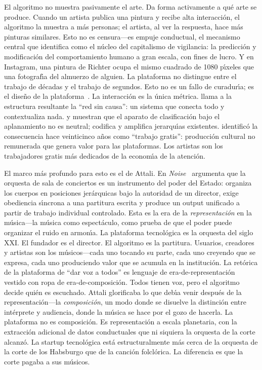 \documentclass[10pt,letterpaper,twocolumn]{article}
\begin{document}
El algoritmo no muestra pasivamente el arte. Da forma activamente a qu\'{e} arte se produce. Cuando un artista publica una pintura y recibe alta interacci\'{o}n, el algoritmo la muestra a m\'{a}s personas; el artista, al ver la respuesta, hace m\'{a}s pinturas similares. Esto no es censura---es empuje conductual, el mecanismo central que \citet{zuboff2019surveillance} identifica como el n\'{u}cleo del capitalismo de vigilancia: la predicci\'{o}n y modificaci\'{o}n del comportamiento humano a gran escala, con fines de lucro. Y en Instagram, una pintura de Richter ocupa el mismo cuadrado de 1080 p\'{\i}xeles que una fotograf\'{\i}a del almuerzo de alguien. La plataforma no distingue entre el trabajo de d\'{e}cadas y el trabajo de segundos. Esto no es un fallo de curadur\'{\i}a; es el dise\~{n}o de la plataforma~\citep{chun2016updating}. La interacci\'{o}n es la \'{u}nica m\'{e}trica. \citet{lovink2011networks} llama a la estructura resultante la ``red sin causa'': un sistema que conecta todo y contextualiza nada. \citet{noble2018algorithms} y \citet{benjamin2019race} muestran que el aparato de clasificaci\'{o}n bajo el aplanamiento no es neutral; codifica y amplifica jerarqu\'{\i}as existentes. \citet{terranova2000free} identific\'{o} la consecuencia hace veinticinco a\~{n}os como ``trabajo gratis'': producci\'{o}n cultural no remunerada que genera valor para las plataformas. Los artistas son los trabajadores gratis m\'{a}s dedicados de la econom\'{\i}a de la atenci\'{o}n.

El marco m\'{a}s profundo para esto es el de Attali. En \emph{Noise}~\citep{attali1985noise} argumenta que la orquesta de sala de conciertos es un instrumento del poder del Estado: organiza los cuerpos en posiciones jer\'{a}rquicas bajo la autoridad de un director, exige obediencia s\'{\i}ncrona a una partitura escrita y produce un output unificado a partir de trabajo individual controlado. Esta es la era de la \emph{representaci\'{o}n} en la m\'{u}sica---la m\'{u}sica como espect\'{a}culo, como prueba de que el poder puede organizar el ruido en armon\'{\i}a. La plataforma tecnol\'{o}gica es la orquesta del siglo XXI. El fundador es el director. El algoritmo es la partitura. Usuarios, creadores y artistas son los m\'{u}sicos---cada uno tocando su parte, cada uno creyendo que se expresa, cada uno produciendo valor que se acumula en la instituci\'{o}n. La ret\'{o}rica de la plataforma de ``dar voz a todos'' es lenguaje de era-de-representaci\'{o}n vestido con ropa de era-de-composici\'{o}n. Todos tienen voz, pero el algoritmo decide qui\'{e}n es escuchado. Attali glorificaba lo que deb\'{\i}a venir despu\'{e}s de la representaci\'{o}n---la \emph{composici\'{o}n}, un modo donde se disuelve la distinci\'{o}n entre int\'{e}rprete y audiencia, donde la m\'{u}sica se hace por el gozo de hacerla. La plataforma no es composici\'{o}n. Es representaci\'{o}n a escala planetaria, con la extracci\'{o}n adicional de datos conductuales que ni siquiera la orquesta de la corte alcanz\'{o}. La startup tecnol\'{o}gica est\'{a} estructuralmente m\'{a}s cerca de la orquesta de la corte de los Habsburgo que de la canci\'{o}n folcl\'{o}rica. La diferencia es que la corte pagaba a sus m\'{u}sicos.
\end{document}

